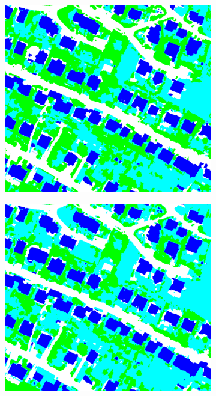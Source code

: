 \begin{figure}[htb]
\begin{subfigure}{0.24\textwidth}
 \end{subfigure}
 \begin{subfigure}{0.24\textwidth}
   \centering
   \includegraphics[width=1\linewidth]{fig/vai/13_manual.png}
 \end{subfigure}
 \begin{subfigure}{0.24\textwidth}
   \centering
   \includegraphics[width=1\linewidth]{fig/vai/13_auto.png}
 \end{subfigure}
 

\end{figure}
